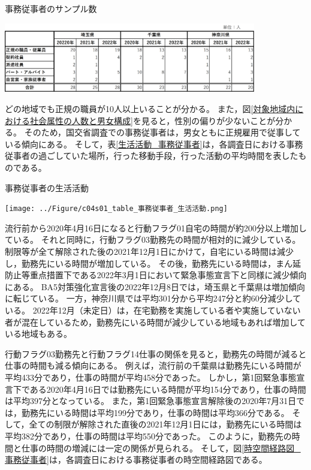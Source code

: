 \documentclass[paper={210mm,297mm},fontsize=15Q,line_length=35zw,number_of_lines=31,head_space=30mm,gutter=40mm,baselineskip=2.0zw,headfoot_verticalposition=1.5zw]{jlreq}
\begin{document}
\begin{table}[H]
  \centering
  \caption{事務従事者のサンプル数}
  \includegraphics[width=110mm]{../Figure/c04s01_table_事務従事者_サンプル数.png}
  \label{sample_事務従事者}
\end{table}

どの地域でも正規の職員が10人以上いることが分かる。
また，図\ref{対象地域内における社会属性の人数と男女構成}を見ると，性別の偏りが少ないことが分かる。
そのため，国交省調査での事務従事者は，男女ともに正規雇用で従事している傾向にある。
そして，表\ref{生活活動_事務従事者}は，各調査日における事務従事者の過ごしていた場所，行った移動手段，行った活動の平均時間を表したものである。

\begin{table}[H]
  \centering
  \caption{事務従事者の生活活動}
  \texttt{[image: ../Figure/c04s01\_table\_事務従事者\_生活活動.png]}
  \label{生活活動_事務従事者}
\end{table}

流行前から2020年4月16日になると行動フラグ01自宅の時間が約200分以上増加している。
それと同時に，行動フラグ03勤務先の時間が相対的に減少している。
制限等が全て解除された後の2021年12月1日にかけて，自宅にいる時間は減少し，勤務先にいる時間が増加している。
その後，勤務先にいる時間は，まん延防止等重点措置下である2022年3月1日において緊急事態宣言下と同様に減少傾向にある。
BA5対策強化宣言後の2022年12月8日では，埼玉県と千葉県は増加傾向に転じている。
一方，神奈川県では平均301分から平均247分と約60分減少している。
2022年12月（未定日）は，在宅勤務を実施している者や実施していない者が混在しているため，勤務先にいる時間が減少している地域もあれば増加している地域もある。

行動フラグ03勤務先と行動フラグ14仕事の関係を見ると，勤務先の時間が減ると仕事の時間も減る傾向にある。
例えば，流行前の千葉県は勤務先にいる時間が平均433分であり，仕事の時間が平均458分であった。
しかし，第1回緊急事態宣言下である2020年4月16日では勤務先にいる時間が平均154分であり，仕事の時間は平均397分となっている。
また，第1回緊急事態宣言解除後の2020年7月31日では，勤務先にいる時間は平均199分であり，仕事の時間は平均366分である。
そして，全ての制限が解除された直後の2021年12月1日には，勤務先にいる時間は平均382分であり，仕事の時間は平均550分であった。
このように，勤務先の時間と仕事の時間の増減には一定の関係が見られる。
そして，図\ref{時空間経路図_事務従事者}は，各調査日における事務従事者の時空間経路図である。
\end{document}
